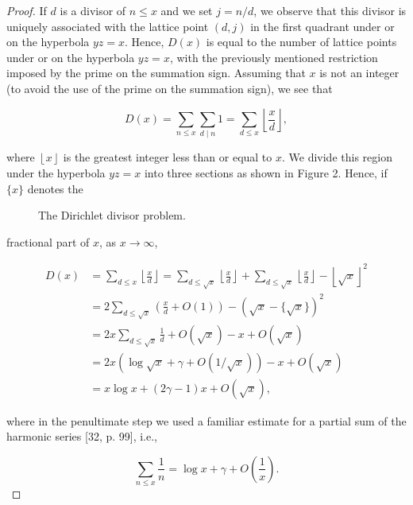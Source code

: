 \documentclass[10pt]{article}
\newcommand{\floor}[1]{\left\lfloor #1\right\rfloor}
\theoremstyle{plain}
\begin{document}
\begin{proof}
If $d$ is a divisor of $n \leq x$ and we set $j=n/d$, we observe that this divisor is uniquely associated with the lattice point $(d, j)$ in the first quadrant under or on the hyperbola $yz=x$. Hence, $D(x)$ is equal to the number of lattice points under or on the hyperbola $yz=x$, with the previously mentioned restriction imposed by the prime on the summation sign. Assuming that $x$ is not an integer (to avoid the use of the prime on the summation sign), we see that

$$
D(x)=\sum_{n \leq x} \sum_{d \mid n} 1=\sum_{d \leq x}\floor{\frac{x}{d}},
$$

where $\floor{x}$ is the greatest integer less than or equal to $x$. We divide this region under the hyperbola $yz=x$ into three sections as shown in Figure 2. Hence, if $\{x\}$ denotes the

\begin{figure}[H]
\centering
{}
\caption{The Dirichlet divisor problem.}
\label{fig:divisor-problem}
\end{figure}

fractional part of $x$, as $x \to \infty$,

$$
\begin{aligned}
D(x) & =\sum_{d \leq x}\floor{\frac{x}{d}}=\sum_{d \leq \sqrt{x}}\floor{\frac{x}{d}}+\sum_{d \leq \sqrt{x}}\floor{\frac{x}{d}}-\floor{\sqrt{x}}^{2} \\
& =2 \sum_{d \leq \sqrt{x}}\left(\frac{x}{d}+O(1)\right)-(\sqrt{x}-\{\sqrt{x}\})^{2} \\
& =2 x \sum_{d \leq \sqrt{x}} \frac{1}{d}+O(\sqrt{x})-x+O(\sqrt{x}) \\
& =2 x(\log \sqrt{x}+\gamma+O(1 / \sqrt{x}))-x+O(\sqrt{x}) \\
& =x \log x+(2 \gamma-1) x+O(\sqrt{x}),
\end{aligned}
$$

where in the penultimate step we used a familiar estimate for a partial sum of the harmonic series [32, p. 99], i.e.,

$$
\sum_{n \leq x} \frac{1}{n}=\log x+\gamma+O\left(\frac{1}{x}\right) .
$$
\end{proof}
\end{document}
